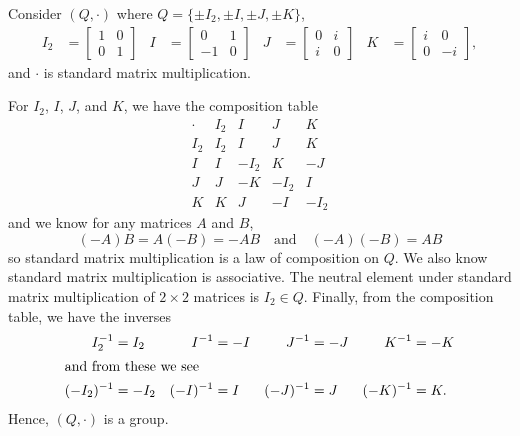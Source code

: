 \begin{exer}
Consider $ (Q,\cdot) $ where $ Q=\{\pm I_2,\pm I,\pm J,\pm K\} $,
\begin{align*}
    I_2&=
    \begin{bmatrix}
        1 & 0 \\
        0 & 1
    \end{bmatrix}
    &
    I&=
    \begin{bmatrix}
        0 & 1 \\
        -1 & 0
    \end{bmatrix}
    &
    J&=
    \begin{bmatrix}
        0 & i \\
        i & 0
    \end{bmatrix}
    &
    K&=
    \begin{bmatrix}
        i & 0 \\
        0 & -i
    \end{bmatrix},
\end{align*}
and $ \cdot $ is standard matrix multiplication.
\end{exer}
\begin{sltn}
For $ I_2 $, $ I $, $ J $, and $ K $, we have the composition table
\begin{equation*}
    \begin{array}{c|cccc}
        \cdot & I_2  & I    & J    & K    \\
        \hline
        I_2   & I_2  & I    & J    & K    \\
        I     & I    & -I_2 & K    & -J   \\
        J     & J    & -K   & -I_2 & I    \\
        K     & K    & J    & -I   & -I_2
    \end{array}
\end{equation*}
and we know for any matrices $ A $ and $ B $,
\begin{equation*}
    (-A)B=A(-B)=-AB \quad\text{and}\quad (-A)(-B)=AB
\end{equation*}
so standard matrix multiplication is a law of composition on $ Q $. We also know standard matrix multiplication is associative. The neutral element under standard matrix multiplication of $ 2\times 2 $ matrices is $ I_2\in Q $. Finally, from the composition table, we have the inverses
\begin{align*}
    I_2^{-1}&=I_2 & I^{-1}&=-I & J^{-1}&=-J & K^{-1}&=-K \\
    \intertext{and from these we see}
    (-I_2)^{-1}&=-I_2 & (-I)^{-1}&=I & (-J)^{-1}&=J & (-K)^{-1}&=K.
\end{align*}
Hence, $ (Q,\cdot) $ is a group.
\end{sltn}

